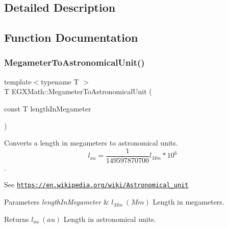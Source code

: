 \subsection{Detailed Description}


\subsection{Function Documentation}
\mbox{\label{group___e_g_x_math-_conversions-_length_conversions-_s_i-_megameter-_astronomical_gac7cc4e20e973762cb87a8934184cdf6d}} 
\subsubsection{\texorpdfstring{Megameter\+To\+Astronomical\+Unit()}{MegameterToAstronomicalUnit()}}
{\footnotesize\ttfamily template$<$typename T $>$ \\
T E\+G\+X\+Math\+::\+Megameter\+To\+Astronomical\+Unit (\begin{DoxyParamCaption}\item[{const T}]{length\+In\+Megameter }\end{DoxyParamCaption})}



Converts a length in megameters to astronomical units. \[ l_{au}= \frac{1}{149597870700} l_{Mm} * 10^{6} \]. 

See \href{https://en.wikipedia.org/wiki/Astronomical_unit}{\tt https\+://en.\+wikipedia.\+org/wiki/\+Astronomical\+\_\+unit} 
\begin{DoxyParams}{Parameters}
{\em length\+In\+Megameter} & $ l_{Mm}\ (Mm)$ Length in megameters. \\
\hline
\end{DoxyParams}
\begin{DoxyReturn}{Returns}
$ l_{au}\ (au)$ Length in astronomical units. 
\end{DoxyReturn}
\mbox{\label{group___e_g_x_math-_conversions-_length_conversions-_s_i-_megameter-_astronomical_ga6f5018465cf15f75912695e069b86795}} 
